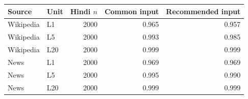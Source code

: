 \begin{tabular}{llrrr}
\toprule
Source & Unit & Hindi $n$ & Common input & Recommended input \\
\midrule
Wikipedia & L1 & 2000 & 0.965 & 0.957 \\
Wikipedia & L5 & 2000 & 0.993 & 0.985 \\
Wikipedia & L20 & 2000 & 0.999 & 0.999 \\
News & L1 & 2000 & 0.969 & 0.969 \\
News & L5 & 2000 & 0.995 & 0.990 \\
News & L20 & 2000 & 0.999 & 0.999 \\
\bottomrule
\end{tabular}
